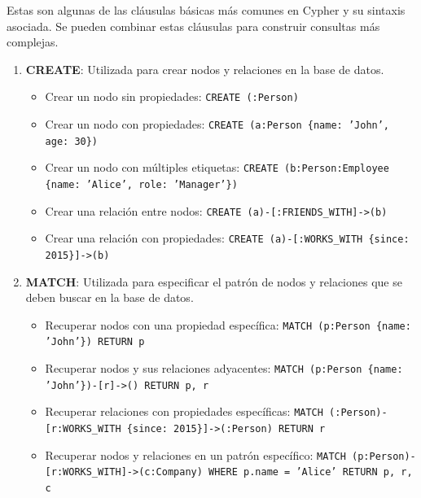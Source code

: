 \documentclass[pdflatex,sn-mathphys-num]{sn-jnl}
\theoremstyle{thmstyleone}%
\theoremstyle{thmstyletwo}%
\theoremstyle{thmstylethree}%
\begin{document}
Estas son algunas de las cláusulas básicas más comunes en Cypher y su sintaxis asociada. Se pueden combinar estas cláusulas para construir consultas más complejas.
\begin{enumerate}
    \item \textbf{CREATE}: Utilizada para crear nodos y relaciones en la base de datos.
    \begin{itemize}
        \item Crear un nodo sin propiedades: \newline
        \texttt{CREATE (:Person)}
        \item Crear un nodo con propiedades: \newline
        \texttt{CREATE (a:Person \{name: 'John', age: 30\})}
        \item Crear un nodo con múltiples etiquetas: \newline
        \texttt{CREATE (b:Person:Employee \{name: 'Alice', role: 'Manager'\})}
        \item Crear una relación entre nodos: \newline
        \texttt{CREATE (a)-[:FRIENDS\_WITH]->(b)}
        \item Crear una relación con propiedades: \newline
        \texttt{CREATE (a)-[:WORKS\_WITH \{since: 2015\}]->(b)}
    \end{itemize}
    \item \textbf{MATCH}: Utilizada para especificar el patrón de nodos y relaciones que se deben buscar en la base de datos.
    \begin{itemize}
        \item Recuperar nodos con una propiedad específica: \newline
        \texttt{MATCH (p:Person \{name: 'John'\}) RETURN p}
        \item Recuperar nodos y sus relaciones adyacentes: \newline
        \texttt{MATCH (p:Person \{name: 'John'\})-[r]->() RETURN p, r}
        \item Recuperar relaciones con propiedades específicas: \newline
        \texttt{MATCH (:Person)-[r:WORKS\_WITH \{since: 2015\}]->(:Person) RETURN r}
        \item Recuperar nodos y relaciones en un patrón específico: \newline
        \texttt{MATCH (p:Person)-[r:WORKS\_WITH]->(c:Company) WHERE p.name = 'Alice' RETURN p, r, c}
    \end{itemize}

\end{enumerate}
\end{document}
